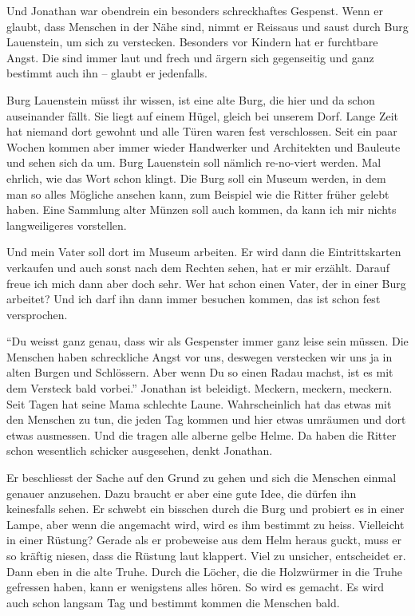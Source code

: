 Und Jonathan war obendrein ein besonders schreckhaftes Gespenst. Wenn er glaubt, dass Menschen in der Nähe sind, nimmt er Reissaus und saust durch Burg Lauenstein, um sich zu verstecken. Besonders vor Kindern hat er furchtbare Angst. Die sind immer laut und frech und ärgern sich gegenseitig und ganz bestimmt auch ihn -- glaubt er jedenfalls. 

\begin{mdframed}[style=mystyle]
Burg Lauenstein müsst ihr wissen, ist eine alte Burg, die hier und da schon auseinander fällt. Sie liegt auf einem Hügel, gleich bei unserem Dorf. Lange Zeit hat niemand dort gewohnt und alle Türen waren fest verschlossen. Seit ein paar Wochen kommen aber immer wieder Handwerker und Architekten und Bauleute und sehen sich da um. Burg Lauenstein soll nämlich re-no-viert werden. Mal ehrlich, wie das Wort schon klingt. Die Burg soll ein Museum werden, in dem man so alles Mögliche ansehen kann, zum Beispiel wie die Ritter früher gelebt haben. Eine Sammlung alter Münzen soll auch kommen, da kann ich mir nichts langweiligeres vorstellen. 

Und mein Vater soll dort im Museum arbeiten. Er wird dann die Eintrittskarten verkaufen und auch sonst nach dem Rechten sehen, hat er mir erzählt. Darauf freue ich mich dann aber doch sehr. Wer hat schon einen Vater, der in einer Burg arbeitet? Und ich darf ihn dann immer besuchen kommen, das ist schon fest versprochen.
\end{mdframed}

\enquote{Du weisst ganz genau, dass wir als Gespenster immer ganz leise sein müssen. Die Menschen haben schreckliche Angst vor uns, deswegen verstecken wir uns ja in alten Burgen und Schlössern. Aber wenn Du so einen Radau machst, ist es mit dem Versteck bald vorbei.} Jonathan ist beleidigt. Meckern, meckern, meckern. Seit Tagen hat seine Mama schlechte Laune. Wahrscheinlich hat das etwas mit den Menschen zu tun, die jeden Tag kommen und hier etwas umräumen und dort etwas ausmessen. Und die tragen alle alberne gelbe Helme. Da haben die Ritter schon wesentlich schicker ausgesehen, denkt Jonathan. 

Er beschliesst der Sache auf den Grund zu gehen und sich die Menschen einmal genauer anzusehen. Dazu braucht er aber eine gute Idee, die dürfen ihn keinesfalls sehen. Er schwebt ein bisschen durch die Burg und probiert es in einer Lampe, aber wenn die angemacht wird, wird es ihm bestimmt zu heiss. Vielleicht in einer Rüstung? Gerade als er probeweise aus dem Helm heraus guckt, muss er so kräftig niesen, dass die Rüstung laut klappert. Viel zu unsicher, entscheidet er. Dann eben in die alte Truhe. Durch die Löcher, die die Holzwürmer in die Truhe gefressen haben, kann er wenigstens alles hören. So wird es gemacht. Es wird auch schon langsam Tag und bestimmt kommen die Menschen bald.  

